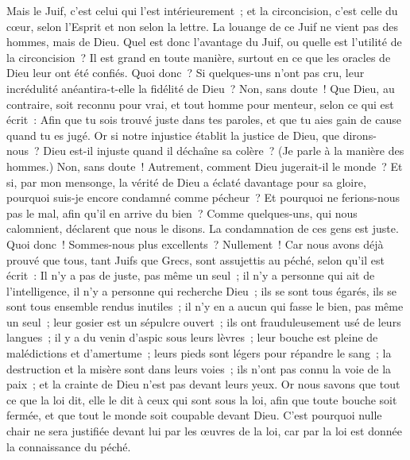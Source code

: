 \begin{multicols}{2}
Mais le Juif, c'est celui qui l'est intérieurement~; et la circoncision, c'est celle du cœur, selon l'Esprit et non selon la lettre. La louange de ce Juif ne vient pas des hommes, mais de Dieu.
\VerseOne{}Quel est donc l'avantage du Juif, ou quelle est l'utilité de la circoncision~?
Il est grand en toute manière, surtout en ce que les oracles de Dieu leur ont été confiés.
Quoi donc~? Si quelques-uns n'ont pas cru, leur incrédulité anéantira-t-elle la fidélité de Dieu~?
Non, sans doute~! Que Dieu, au contraire, soit reconnu pour vrai, et tout homme pour menteur, selon ce qui est écrit~: Afin que tu sois trouvé juste dans tes paroles, et que tu aies gain de cause quand tu es jugé.
Or si notre injustice établit la justice de Dieu, que dirons-nous~? Dieu est-il injuste quand il déchaîne sa colère~? (Je parle à la manière des hommes.)
Non, sans doute~! Autrement, comment Dieu jugerait-il le monde~?
Et si, par mon mensonge, la vérité de Dieu a éclaté davantage pour sa gloire, pourquoi suis-je encore condamné comme pécheur~?
Et pourquoi ne ferions-nous pas le mal, afin qu'il en arrive du bien~? Comme quelques-uns, qui nous calomnient, déclarent que nous le disons. La condamnation de ces gens est juste.
Quoi donc~! Sommes-nous plus excellents~? Nullement~! Car nous avons déjà prouvé que tous, tant Juifs que Grecs, sont assujettis au péché,
selon qu'il est écrit~: Il n'y a pas de juste, pas même un seul~;
il n'y a personne qui ait de l'intelligence, il n'y a personne qui recherche Dieu~; ils se sont tous égarés, ils se sont tous ensemble rendus inutiles~;
il n'y en a aucun qui fasse le bien, pas même un seul~;
leur gosier est un sépulcre ouvert~; ils ont frauduleusement usé de leurs langues~; il y a du venin d'aspic sous leurs lèvres~;
leur bouche est pleine de malédictions et d'amertume~;
leurs pieds sont légers pour répandre le sang~;
la destruction et la misère sont dans leurs voies~;
ils n'ont pas connu la voie de la paix~;
et la crainte de Dieu n'est pas devant leurs yeux.
Or nous savons que tout ce que la loi dit, elle le dit à ceux qui sont sous la loi, afin que toute bouche soit fermée, et que tout le monde soit coupable devant Dieu.
C'est pourquoi nulle chair ne sera justifiée devant lui par les œuvres de la loi, car par la loi est donnée la connaissance du péché.

\end{multicols}
